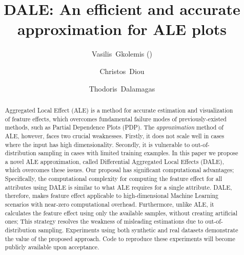 \documentclass[runningheads, envcountsame, a4paper]{llncs}
\begin{document}
\title{DALE: An efficient and accurate approximation for ALE plots}

\author{Vasilis~Gkolemis (\Letter) \and
  Christos~Diou \and
  Thodoris~Dalamagas}
%
%


\maketitle
\setcounter{footnote}{0}

\begin{abstract}
  Aggregated Local Effect (ALE) is a method for accurate estimation
  and visualization of feature effects, which overcomes fundamental
  failure modes of previously-existed methods, such as Partial
  Dependence Plots (PDP). The \textit{approximation} method of ALE,
  however, faces two crucial weaknesses. Firstly, it does not scale
  well in cases where the input has high dimensionality. Secondly, it
  is vulnerable to out-of-distribution sampling in cases with limited
  training examples. In this paper we propose a novel ALE
  approximation, called Differential Aggregated Local Effects (DALE),
  which overcomes these issues. Our proposal has significant
  computational advantages; Specifically, the computational complexity
  for computing the feature effect for all attributes using DALE is
  similar to what ALE requires for a single attribute. DALE,
  therefore, makes feature effect applicable to high-dimensional
  Machine Learning scenarios with near-zero computational
  overhead. Furthermore, unlike ALE, it calculates the feature effect
  using only the available samples, without creating artificial ones;
  This strategy resolves the weakness of misleading estimations due to
  out-of-distribution sampling. Experiments using both synthetic and
  real datasets demonstrate the value of the proposed approach. Code
  to reproduce these experiments will become publicly available upon
  acceptance.


\end{abstract}
\end{document}
